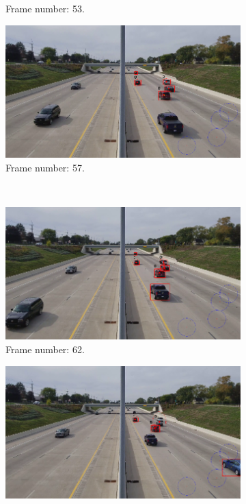 \begin{figure}[H]
\begin{subfigure}{0.48\textwidth}
        \caption{Frame number: 53.}
        \label{fig:E1-V1-S2:03}
    \end{subfigure}
    \begin{subfigure}{0.48\textwidth}
        \centering
        \includegraphics[width=\linewidth]{../../../experiments/E1/V1/SAM/57}
        \caption{Frame number: 57.}
        \label{fig:E1-V1-S2:04}
    \end{subfigure}
    \\
    \begin{subfigure}{0.48\textwidth}
        \centering
        \includegraphics[width=\linewidth]{../../../experiments/E1/V1/SAM/62}
        \caption{Frame number: 62.}
        \label{fig:E1-V1-S2:05}
    \end{subfigure}
    \begin{subfigure}{0.48\textwidth}
        \centering
        \includegraphics[width=\linewidth]{../../../experiments/E1/V1/SAM/69}

\end{subfigure}
\end{figure}
